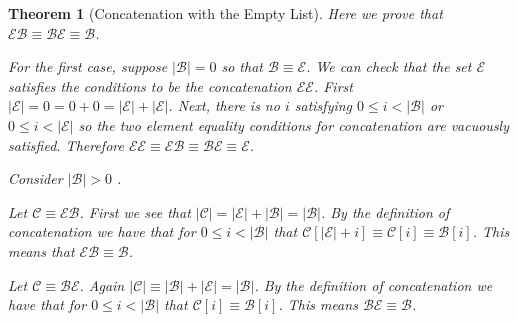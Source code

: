 \documentclass[12pt]{article}
\theoremstyle{break}
\theoremstyle{break}
\newtheorem{theorem}{Theorem}[section]
\theoremstyle{break}
\theoremstyle{break}
\newcommand{\mc}[1]{\mathcal{#1}}
\begin{document}
\begin{theorem}[Concatenation with the Empty List]
Here we prove that $\mc{E}\mc{B} \equiv \mc{B} \mc{E} \equiv \mc{B}$.

For the first case, suppose $|\mc{B}|= 0$ so that $\mc{B}\equiv \mc{E}$.
We can check that the set $\mc{E}$ satisfies the conditions to be the concatenation $\mc{E}\mc{E}$. 
First $|\mc{E}| = 0 = 0 + 0 = |\mc{E}| + |\mc{E}|$. 
Next, there is no $i$ satisfying $0 \le i < |\mc{B}|$ or $0 \le i < |\mc{E}|$ so the two element equality conditions for concatenation are vacuously satisfied. 
Therefore $\mc{E}\mc{E} \equiv \mc{E}\mc{B} \equiv \mc{B}\mc{E} \equiv \mc{E}$.

Consider $|\mc{B}|>0$ .

Let $\mc{C} \equiv \mc{E}\mc{B}$. 
First we see that $|\mc{C}| = |\mc{E}| + |\mc{B}| = |\mc{B}|$.
By the definition of concatenation we have that for $0 \le i < |\mc{B}|$ that $\mc{C}[|\mc{E}| + i] \equiv \mc{C}[i] \equiv \mc{B}[i]$. 
This means that $\mc{E}\mc{B}\equiv\mc{B}$.

Let $\mc{C} \equiv \mc{B}\mc{E}$. 
Again $|\mc{C}| \equiv |\mc{B}|+|\mc{E}| = |\mc{B}|$. 
By the definition of concatenation we have that for $0 \le i < |\mc{B}|$ that $\mc{C}[i] \equiv \mc{B}[i]$. 
This means $\mc{B}\mc{E} \equiv \mc{B}$.
\end{theorem}
\end{document}

